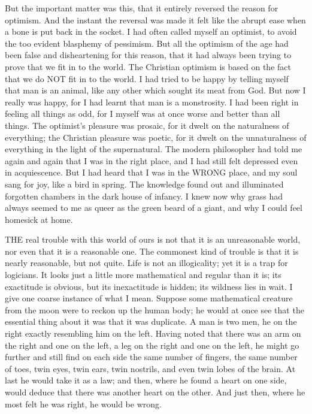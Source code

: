 But the important matter was this, that it entirely reversed the reason for optimism. And the instant the reversal was made it felt like the abrupt ease when a bone is put back in the socket. I had often called myself an optimist, to avoid the too evident blasphemy of pessimism. But all the optimism of the age had been false and disheartening for this reason, that it had always been trying to prove that we fit in to the world. The Christian optimism is based on the fact that we do NOT fit in to the world. I had tried to be happy by telling myself that man is an animal, like any other which sought its meat from God. But now I really was happy, for I had learnt that man is a monstrosity. I had been right in feeling all things as odd, for I myself was at once worse and better than all things. The optimist’s pleasure was prosaic, for it dwelt on the naturalness of everything; the Christian pleasure was poetic, for it dwelt on the unnaturalness of everything in the light of the supernatural. The modern philosopher had told me again and again that I was in the right place, and I had still felt depressed even in acquiescence. But I had heard that I was in the WRONG place, and my soul sang for joy, like a bird in spring. The knowledge found out and illuminated forgotten chambers in the dark house of infancy. I knew now why grass had always seemed to me as queer as the green beard of a giant, and why I could feel homesick at home.


THE real trouble with this world of ours is not that it is an unreasonable world, nor even that it is a reasonable one. The commonest kind of trouble is that it is nearly reasonable, but not quite. Life is not an illogicality; yet it is a trap for logicians. It looks just a little more mathematical and regular than it is; its exactitude is obvious, but its inexactitude is hidden; its wildness lies in wait. I give one coarse instance of what I mean. Suppose some mathematical creature from the moon were to reckon up the human body; he would at once see that the essential thing about it was that it was duplicate. A man is two men, he on the right exactly resembling him on the left. Having noted that there was an arm on the right and one on the left, a leg on the right and one on the left, he might go further and still find on each side the same number of fingers, the same number of toes, twin eyes, twin ears, twin nostrils, and even twin lobes of the brain. At last he would take it as a law; and then, where he found a heart on one side, would deduce that there was another heart on the other. And just then, where he most felt he was right, he would be wrong.


